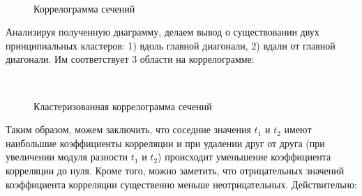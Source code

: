 \documentclass[14pt,a4paper]{scrartcl}
\begin{document}
\begin{figure}[H]
	\begin{minipage}[h]{1\linewidth}
		  \\
		\caption*{Коррелограмма сечений}
	\end{minipage}
\end{figure}


Анализируя полученную диаграмму, делаем вывод о существовании двух принципиальных кластеров: 1) вдоль главной диагонали, 2) вдали от главной диагонали. Им соответствует 3 области на коррелограмме:

\begin{figure}[H]
	\begin{minipage}[h]{1\linewidth}
		  \\
		\caption*{Кластеризованная коррелограмма сечений}
	\end{minipage}
\end{figure}

\pagebreak
Таким образом, можем заключить, что соседние значения $t_1$ и $t_2$ имеют наибольшие коэффициенты корреляции и при удалении друг от друга (при увеличении модуля разности $t_1$ и $t_2$) происходит уменьшение коэффициента корреляции до нуля. Кроме того, можно заметить, что отрицательных значений коэффициента корреляции существенно меньше неотрицательных. Действительно:
\end{document}
